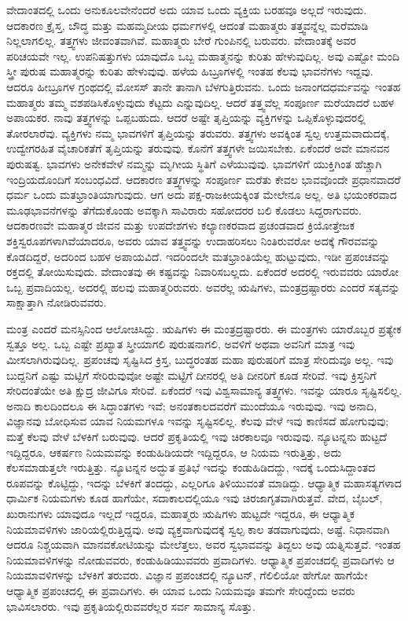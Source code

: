 ವೇದಾಂತದಲ್ಲಿ ಒಂದು ಅನುಕೂಲವೇನೆಂದರೆ ಅದು ಯಾವ ಒಂದು ವ್ಯಕ್ತಿಯ ಬರಹವೂ ಅಲ್ಲದೆ ಇರುವುದು. ಆದಕಾರಣ ಕ್ರೈಸ್ತ, ಬೌದ್ಧ ಮತ್ತು ಮಹಮ್ಮದೀಯ ಧರ್ಮಗಳಲ್ಲಿ ಆದಂತೆ ಮಹಾತ್ಮರು ತತ್ತ್ವವನ್ನೆಲ್ಲ ಮರೆಮಾಡಿ ನಿಲ್ಲಲಾಗಲಿಲ್ಲ. ತತ್ತ್ವಗಳು ಜೀವಂತವಾಗಿವೆ. ಮಹಾತ್ಮರು ಬೇರೆ ಗುಂಪಿನಲ್ಲಿ ಬರುವರು. ವೇದಾಂತಕ್ಕೆ ಅವರ ಪರಿಚಯವೇ ಇಲ್ಲ. ಉಪನಿಷತ್ತುಗಳು ಯಾವುದೊ ಒಬ್ಬ ಮಹಾತ್ಮನನ್ನು ಕುರಿತು ಹೇಳುವುದಿಲ್ಲ. ಅವು ಎಷ್ಟೋ ಮಂದಿ ಸ್ತ್ರೀ ಪುರುಷ ಮಹಾತ್ಮರನ್ನು ಕುರಿತು ಹೇಳುವುವು. ಹಳೆಯ ಹಿಬ್ರೂಗಳಲ್ಲಿ ಇಂತಹ ಕೆಲವು ಭಾವನೆಗಳು ಇದ್ದವು. ಆದರೂ ಹೀಬ್ರೂಗಳ ಗ್ರಂಥದಲ್ಲಿ ಮೋಸಸ್ ತಾನೇ ತಾನಾಗಿ ಬೆಳಗುತ್ತಿರುವನು. ಒಂದು ಜನಾಂಗದ\break ಧರ್ಮವನ್ನು ಇಂತಹ ಮಹಾತ್ಮರು ತಮ್ಮ ವಶಪಡಿಸಿಕೊಳ್ಳುವುದು ಕೆಟ್ಟದು ಎನ್ನುವುದಿಲ್ಲ. ಆದರೆ ತತ್ತ್ವವೆಲ್ಲ ಸಂಪೂರ್ಣ ಮರೆಯಾದರೆ ಬಹಳ ಅಪಾಯಕರ. ನಾವು ತತ್ತ್ವಗಳನ್ನು ಒಪ್ಪಬಹುದು. ಆದರೆ ಅಷ್ಟೇ ತೃಪ್ತಿಯನ್ನು ವ್ಯಕ್ತಿಗಳನ್ನು ಒಪ್ಪಿಕೊಳ್ಳುವುದರಲ್ಲಿ ತೋರಲಾರೆವು. ವ್ಯಕ್ತಿಗಳು ನಮ್ಮ ಭಾವಗಳಿಗೆ ತೃಪ್ತಿಯನ್ನು ತರುವರು. ತತ್ತ್ವಗಳು ಅವಕ್ಕಿಂತ ಸ್ವಲ್ಪ ಉತ್ತಮವಾದುದಕ್ಕೆ, ಉದ್ವೇಗರಹಿತ ವೈಚಾರಿಕತೆಗೆ ತೃಪ್ತಿಯನ್ನು ತರುವುವು. ಕೊನೆಗೆ ತತ್ತ್ವಗಳೇ ಜಯಿಸಬೇಕು. ಏಕೆಂದರೆ ಅವೇ ಮಾನವನ ಪುರುಷತ್ವ. ಭಾವಗಳು ಅನೇಕವೇಳೆ ನಮ್ಮನ್ನು ಮೃಗೀಯ ಸ್ಥಿತಿಗೆ ಎಳೆಯುವುವು. ಭಾವಗಳಿಗೆ ಯುಕ್ತಿಗಿಂತ ಹೆಚ್ಚಾಗಿ ಇಂದ್ರಿಯದೊಂದಿಗೆ ಸಂಬಂಧವಿದೆ. ಆದಕಾರಣ ತತ್ತ್ವಗಳನ್ನು ಸಂಪೂರ್ಣ ಮರೆತು ಕೇವಲ ಭಾವವೊಂದೇ ಪ್ರಧಾನವಾದರೆ ಧರ್ಮ ಒಂದು ಮತಭ್ರಾಂತಿಯಾಗುವುದು. ಆಗ ಅದು ಪಕ್ಷ-ರಾಜಕೀಯಕ್ಕಿಂತ ಮೇಲೇನೂ ಅಲ್ಲ. ಅತಿ ಭಯಂಕರವಾದ ಮೂಢಭಾವನೆಗಳನ್ನು ತೆಗೆದುಕೊಂಡು ಅವಕ್ಕಾಗಿ ಸಾವಿರಾರು ಸಹೋದರರ ಬಲಿ ಕೊಡಲು ಸಿದ್ದರಾಗುವರು. ಆದಕಾರಣವೇ ಮಹಾತ್ಮರ ಜೀವನ ಮತ್ತು ಉಪದೇಶಗಳು ಕಲ್ಯಾಣಕರವಾದ ಪ್ರಚಂಡವಾದ ಕ್ರಿಯೋತ್ತೇಜಕ ಶಕ್ತಿಸ್ವರೂಪಗಳಾಗಿವೆಯಾದರೂ, ಅವರು ಯಾವ ತತ್ತ್ವವನ್ನು ಉದಾಹರಿಸಲು ನಿಂತಿರುವರೋ ಅದಕ್ಕೆ ಗೌರವವನ್ನು ಕೊಡದಿದ್ದರೆ, ಅದರಿಂದ ಬಹಳ ಅಪಾಯವಿದೆ. ಇದರಿಂದಲೇ ಮತಭ್ರಾಂತಿಯೆಲ್ಲ ಹುಟ್ಟುವುದು, ಇಡೀ ಪ್ರಪಂಚವನ್ನು ರಕ್ತದಲ್ಲಿ ತೋಯಿಸುವುದು. ವೇದಾಂತವು ಈ ಕಷ್ಟವನ್ನು ನಿವಾರಿಸಬಲ್ಲದು. ಏಕೆಂದರೆ ಅದರಲ್ಲಿ ಇರುವವರು ಯಾರೋ ಒಬ್ಬ ಪ್ರವಾದಿಯಲ್ಲ. ಅದರಲ್ಲಿ ಹಲವು ಮಹಾತ್ಮರಿರುವರು. ಅವರೆಲ್ಲ ಋಷಿಗಳು, ಮಂತ್ರದ್ರಷ್ಟಾರರು ಎಂದರೆ ಸತ್ಯವನ್ನು ಸಾಕ್ಷಾತ್ತಾಗಿ ನೋಡಿರುವವರು.

ಮಂತ್ರ ಎಂದರೆ ಮನಸ್ಸಿನಿಂದ ಆಲೋಚಿಸಿದ್ದು. ಋಷಿಗಳು ಈ ಮಂತ್ರದ್ರಷ್ಟಾರರು. ಈ ಮಂತ್ರಗಳು ಯಾರೊಬ್ಬರ ಪ್ರತ್ಯೇಕ ಸ್ವತ್ತೂ ಅಲ್ಲ. ಒಬ್ಬ ಎಷ್ಟೇ ಪ್ರಖ್ಯಾತ ಸ್ತ್ರೀಯಾಗಲಿ ಪುರುಷನಾಗಲಿ, ಅವಳಿಗೆ ಅಥವಾ ಅವನಿಗೆ ಮಾತ್ರ ಇವು ಮೀಸಲಾಗಿರುವುದಿಲ್ಲ. ಪ್ರಪಂಚವು ಸೃಷ್ಟಿಸಿದ ಕ್ರಿಸ್ತ, ಬುದ್ಧರಂತಹ ಮಹಾ ಪುರುಷರಿಗೆ ಮಾತ್ರ ಸೇರಿದುವೂ ಅಲ್ಲ. ಇವು ಬುದ್ದನಿಗೆ ಎಷ್ಟು ಮಟ್ಟಿಗೆ ಸೇರಿರುವುವೋ ಅಷ್ಟೇ ಮಟ್ಟಿಗೆ ದೀನರಲ್ಲಿ ಅತಿ ದೀನರಿಗೆ ಕೂಡ ಸೇರಿವೆ. ಇವು ಕ್ರಿಸ್ತನಿಗೆ ಸೇರಿದಂತೆಯೇ ಅತಿ ಕ್ಷುದ್ರ ಜೀವಿಗೂ ಸೇರಿವೆ. ಏಕೆಂದರೆ ಇವು ವಿಶ್ವಸಾಮಾನ್ಯ ತತ್ತ್ವಗಳು. ಇವನ್ನು ಯಾರೂ ಸೃಷ್ಟಿಸಲಿಲ್ಲ. ಅನಾದಿ ಕಾಲದಿಂದಲೂ ಈ ಸಿದ್ಧಾಂತಗಳು ಇವೆ; ಅನಂತಕಾಲದವರೆಗೆ ಮುಂದೆಯೂ ಇರುವುವು. ಇವು ಅನಾದಿ, ವಿಜ್ಞಾನವು ಬೋಧಿಸುವ ಯಾವ ನಿಯಮಗಳೂ ಇವನ್ನು ಸೃಷ್ಟಿಸಲಿಲ್ಲ. ಕೆಲವು ವೇಳೆ ಇವು ಕಾಣಿಸದೆ ಹೋಗುವುವು; ಮತ್ತೆ ಕೆಲವು ವೇಳೆ ಬೆಳಕಿಗೆ ಬರುವುವು. ಆದರೆ ಪ್ರಕೃತಿಯಲ್ಲಿ ಇವು ಚಿರಕಾಲವೂ ಇರುವುವು. ನ್ಯೂಟನ್ನನು ಹುಟ್ಟದೆ ಇದ್ದಿದ್ದರೂ, ಆಕರ್ಷಣ ನಿಯಮವನ್ನು ಕಂಡುಹಿಡಿಯದೇ ಇದ್ದಿದ್ದರೂ, ಆ ನಿಯಮ ಇರುತ್ತಿತ್ತು, ಅದು ಕೆಲಸಮಾಡುತ್ತಲೇ ಇರುತ್ತಿತ್ತು. ನ್ಯೂಟನ್ನನ ಅದ್ಭುತ ಪ್ರತಿಭೆ ಇದನ್ನು ಕಂಡುಹಿಡಿದದ್ದು, ಇದಕ್ಕೆ ಒಂದುಸಿದ್ದಾಂತದ ರೂಪವನ್ನು ಕೊಟ್ಟಿದ್ದು, ಇದನ್ನು ಬೆಳಕಿಗೆ ತಂದದ್ದು, ಎಲ್ಲರಿಗೂ ತಿಳಿಯುವಂತೆ ಮಾಡಿದ್ದು. ಆಧ್ಯಾತ್ಮಿಕ ಮಹಾಸತ್ಯಗಳಾದ ಧಾರ್ಮಿಕ ನಿಯಮಗಳು ಕೂಡ ಹಾಗೆಯೇ, ಸದಾಕಾಲದಲ್ಲಿಯೂ ಇವು ಚಿರಜಾಗೃತವಾಗಿರುತ್ತವೆ. ವೇದ, ಬೈಬಲ್, ಖುರಾನುಗಳು ಯಾವುದೂ ಇಲ್ಲದೆ ಇದ್ದರೂ, ಮಹಾತ್ಮರು ಋಷಿಗಳು ಹುಟ್ಟದೇ ಇದ್ದರೂ, ಈ ಆಧ್ಯಾತ್ಮಿಕ ನಿಯಮಾವಳಿಗಳು ಜಾರಿಯಲ್ಲಿರುತ್ತಿದ್ದವು. ಅವು ವ್ಯಕ್ತವಾಗುವುದಕ್ಕೆ ಸ್ವಲ್ಪ ಕಾಲ ತಡವಾಗುವುದು, ಅಷ್ಟೆ. ನಿಧಾನವಾಗಿ ಆದರೂ ನಿಶ್ಚಯವಾಗಿ ಮಾನವಕೋಟಿಯನ್ನು ಮೇಲೆತ್ತಲು, ಅವರ ಸ್ವಭಾವವನ್ನು ತಿದ್ದಲು ಅವು ಯತ್ನಿಸುತ್ತವೆ. ಇಂತಹ ನಿಯಮಾವಳಿಗಳನ್ನು ನೋಡುವವರು, ಕಂಡುಹಿಡಿಯುವವರು ಪ್ರವಾದಿಗಳು. ಆಧ್ಯಾತ್ಮಿಕ ಪ್ರಪಂಚದಲ್ಲಿ ಪ್ರವಾದಿಗಳು ಆ ನಿಯಮಾವಳಿಗಳನ್ನು ಬೆಳಕಿಗೆ ತರುವರು. ವಿಜ್ಞಾನ ಪ್ರಪಂಚದಲ್ಲಿ ನ್ಯೂಟನ್, ಗೆಲಿಲಿಯೋ ಹೇಗೋ ಹಾಗೆಯೇ ಆಧ್ಯಾತ್ಮಿಕ ಪ್ರಪಂಚದಲ್ಲಿ ಈ ಪ್ರವಾದಿಗಳು. ಈ ಯಾವ ಒಂದು ನಿಯಮವೂ ತಮಗೇ ಸೇರಿದ್ದೆಂದು ಅವರು ಭಾವಿಸಲಾರರು. ಇವು ಪ್ರಕೃತಿಯಲ್ಲಿರುವವರೆಲ್ಲರ ಸರ್ವ ಸಾಮಾನ್ಯ ಸೊತ್ತು.

